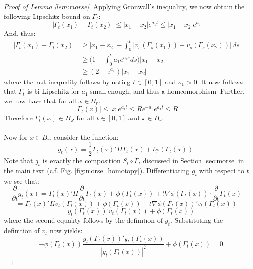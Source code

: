 \documentclass[11pt]{article}
\newcommand{\1}{\mathbf{1}}
\theoremstyle{definition}
\theoremstyle{remark}
\begin{document}
\begin{proof}[Proof of Lemma \ref{lem:morse}]
Applying Gr\"{o}nwall's inequality, we now obtain the following Lipschitz bound on $\Gamma_t$: 
\begin{equation}\nonumber
    |\Gamma_t(x_1) - \Gamma_t(x_2)| \le |x_1-x_2|e^{a_1t} \le |x_1-x_2|e^{a_1}
\end{equation}
And, thus:
\begin{align*}
|\Gamma_t(x_1) - \Gamma_t(x_2)|
&\geq |x_1 - x_2| - \int_0^t|v_s(\Gamma_s(x_1))-v_s(\Gamma_s(x_2))|\ ds\\
&\geq \bigg(1 - \int_0^t a_1e^{a_1s} ds\bigg)|x_1 - x_2| \\
& \geq (2-e^{a_1}) |x_1 - x_2|
\end{align*}
where the last inequality follows by noting $t\in[0,1]$ and $a_1>0$. It now follows that $\Gamma_t$ is bi-Lipschitz for $a_1$ small enough, and thus a homeomorphism. Further, we now have that for all $x \in B_r$:
\begin{equation}\nonumber
    |\Gamma_t(x)| \leq |x|e^{a_1 t} \leq Re^{-a_1}e^{a_1t} \leq R 
\end{equation}
Therefore $\Gamma_t(x)\in B_R$ for all $t\in [0,1]$ and $x \in B_r$. \\
\\
Now for $x \in B_r$, consider the function:
\begin{equation}\nonumber
    g_t(x) = \frac{1}{2}\Gamma_t(x)' H \Gamma_t(x) + t \phi(\Gamma_t(x)).
\end{equation}
Note that $g_t$ is exactly the composition $S_t\circ \Gamma_t$ discussed in Section \ref{sec:morse} in the main text (c.f. Fig. \ref{fig:morse_homotopy}). Differentiating $g_t$ with respect to $t$ we see that:
\begin{equation}\nonumber
    \frac{\partial}{\partial t} g_t(x) = \Gamma_t(x)'H \frac{\partial}{\partial t}\Gamma_t(x) + \phi(\Gamma_t(x)) + t\nabla \phi(\Gamma_t(x))\cdot\frac{\partial}{\partial t}\Gamma_t(x)
\end{equation}
\begin{equation}\nonumber
     = \Gamma_t(x)'H v_t(\Gamma_t(x)) + \phi(\Gamma_t(x)) + t\nabla \phi(\Gamma_t(x))' v_t(\Gamma_t(x))
\end{equation}
\begin{equation}\nonumber
     = y_t(\Gamma_t(x))' v_t(\Gamma_t(x)) + \phi(\Gamma_t(x)) 
\end{equation}
where the second equality follows by the definition of $y_t$. Substituting the definition of $v_t$ now yields:
\begin{equation}\nonumber
     = -\phi(\Gamma_t(x))\frac{y_t(\Gamma_t(x))'y_t(\Gamma_t(x))}{|y_t(\Gamma_t(x))|^2} + \phi(\Gamma_t(x)) = 0 

\end{equation}
\end{proof}
\end{document}
